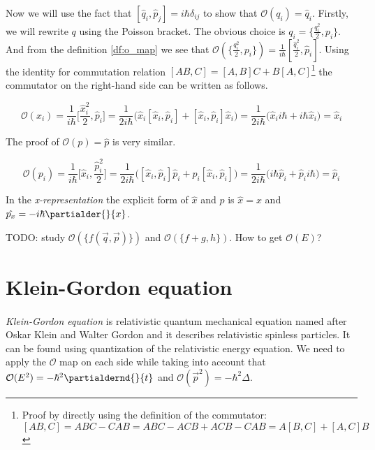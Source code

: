 Now we will use the fact that $[\hat{q}_{i}, \hat{p}_{j}] = i \hbar \delta_{ij}$ to show that $\mathcal{O}(q_{i}) = \hat{q}_{i}$. Firstly, we will
rewrite $q$ using the Poisson bracket. The obvious choice is $q_{i} = \{\frac{q_{i}^{2}}{2}, p_{i}\}$.  
And from the definition \ref{df:o_map} we see that $\mathcal{O}(\{\frac{q_{i}^{2}}{2}, p_{i}\}) = \frac{1}{i \hbar}[\frac{\hat{q}_{i}^{2}}{2}, \hat{p}_{i}]$.
Using the identity for commutation relation $[AB, C] = [A, B]C + B[A, C]$\footnote{Proof by directly using the definition of 
the commutator: $[AB, C] = ABC - CAB = ABC - ACB + ACB - CAB = A [B, C] + [A, C] B$} the commutator on the right-hand side can
be written as follows.

\begin{equation*}
    \mathcal{O}(x_{i}) = \frac{1}{i \hbar}\bigg[\frac{\hat{x}_{i}^{2}}{2}, \hat{p}_{i}\bigg] = 
    \frac{1}{2 i \hbar} \big(\hat{x}_{i} [\hat{x}_{i}, \hat{p}_{i}] + [\hat{x}_{i}, \hat{p}_{i}] \hat{x}_{i}\big) =
    \frac{1}{2 i \hbar} \big(\hat{x}_{i} i \hbar + i \hbar \hat{x}_{i}\big) = \hat{x}_{i}
\end{equation*}

The proof of $\mathcal{O}(p) = \hat{p}$ is very similar.

\begin{equation*}
    \mathcal{O}(p_{i}) = \frac{1}{i \hbar}\bigg[\hat{x}_{i}, \frac{\hat{p}_{i}^{2}}{2}\bigg] = 
    \frac{1}{2 i \hbar} \big([\hat{x}_{i}, \hat{p}_{i}] \hat{p}_{i} + \hat{p}_{i} [\hat{x}_{i}, \hat{p}_{i}]\big) =
    \frac{1}{2 i \hbar} \big(i \hbar \hat{p}_{i} + \hat{p}_{i} i \hbar \big) = \hat{p}_{i}
\end{equation*}

In the \textit{x-representation} the explicit form of $\hat{x}$ and $\hat{p}$ is $\hat{x} = x$ and
$\hat{p_{x}} = - i \hbar \partialder{}{x}$.

TODO: study $\mathcal{O}(\{f(\vec{q}, \vec{p})\})$ and $\mathcal{O}(\{f + g, h\})$. How to get $\mathcal{O}(E)$?

\section{Klein-Gordon equation}

\paragraph{} \textit{Klein-Gordon equation} is relativistic quantum mechanical equation named after Oskar Klein and Walter Gordon and
it describes relativistic spinless particles. It can be found using quantization of the relativistic energy equation. We need to apply the
$\mathcal{O}$ map on each side while taking into account that $\mathcal{O}(E^2) = - \hbar^{2} \partialdernd{}{t}$ and 
$\mathcal{O}(\vec{p}^2) = - \hbar^{2} \Delta$.

